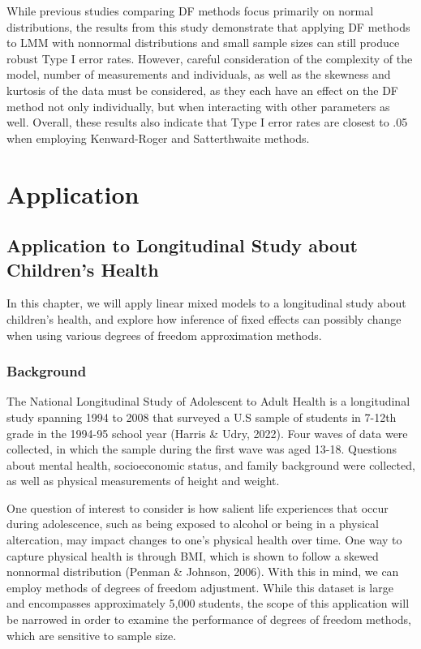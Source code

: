 \documentclass[12pt, twoside]{amherstthesis}
\begin{document}
While previous studies comparing DF methods focus primarily on normal distributions, the results from this study demonstrate that applying DF methods to LMM with nonnormal distributions and small sample sizes can still produce robust Type I error rates. However, careful consideration of the complexity of the model, number of measurements and individuals, as well as the skewness and kurtosis of the data must be considered, as they each have an effect on the DF method not only individually, but when interacting with other parameters as well. Overall, these results also indicate that Type I error rates are closest to .05 when employing Kenward-Roger and Satterthwaite methods.

\hypertarget{math-sci}{%
\chapter{Application}\label{math-sci}}

\hypertarget{application-to-longitudinal-study-about-childrens-health}{%
\section{Application to Longitudinal Study about Children's Health}\label{application-to-longitudinal-study-about-childrens-health}}

In this chapter, we will apply linear mixed models to a longitudinal study about children's health, and explore how inference of fixed effects can possibly change when using various degrees of freedom approximation methods.

\hypertarget{background}{%
\subsection{Background}\label{background}}

The National Longitudinal Study of Adolescent to Adult Health is a longitudinal study spanning 1994 to 2008 that surveyed a U.S sample of students in 7-12th grade in the 1994-95 school year (Harris \& Udry, 2022). Four waves of data were collected, in which the sample during the first wave was aged 13-18. Questions about mental health, socioeconomic status, and family background were collected, as well as physical measurements of height and weight.

One question of interest to consider is how salient life experiences that occur during adolescence, such as being exposed to alcohol or being in a physical altercation, may impact changes to one's physical health over time. One way to capture physical health is through BMI, which is shown to follow a skewed nonnormal distribution (Penman \& Johnson, 2006). With this in mind, we can employ methods of degrees of freedom adjustment. While this dataset is large and encompasses approximately 5,000 students, the scope of this application will be narrowed in order to examine the performance of degrees of freedom methods, which are sensitive to sample size.
\end{document}
